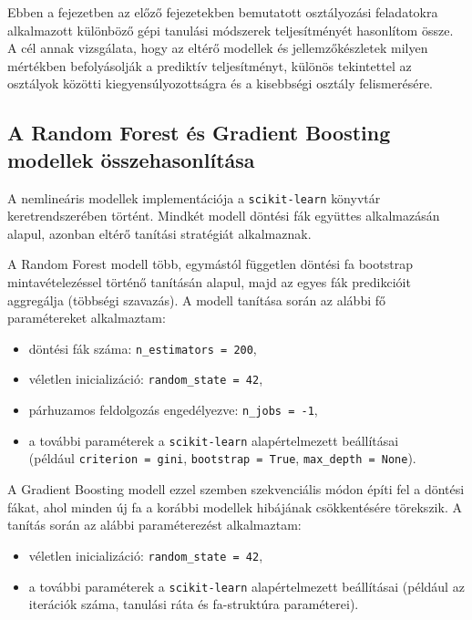 
Ebben a fejezetben az előző fejezetekben bemutatott osztályozási feladatokra
alkalmazott különböző gépi tanulási módszerek teljesítményét hasonlítom össze.
A cél annak vizsgálata, hogy az eltérő modellek és jellemzőkészletek
milyen mértékben befolyásolják a prediktív teljesítményt,
különös tekintettel az osztályok közötti kiegyensúlyozottságra
és a kisebbségi osztály felismerésére.


\subsection{A Random Forest és Gradient Boosting modellek összehasonlítása}

A nemlineáris modellek implementációja a \texttt{scikit-learn} \cite{scikit} könyvtár
keretrendszerében történt. Mindkét modell döntési fák együttes alkalmazásán
alapul, azonban eltérő tanítási stratégiát alkalmaznak.

A Random Forest modell \cite{random forest} több, egymástól független döntési fa
bootstrap mintavételezéssel történő tanításán alapul,
majd az egyes fák predikcióit aggregálja (többségi szavazás).
A modell tanítása során az alábbi fő paramétereket alkalmaztam:

\begin{itemize}
    \item döntési fák száma: \texttt{n\_estimators = 200},
    \item véletlen inicializáció: \texttt{random\_state = 42},
    \item párhuzamos feldolgozás engedélyezve: \texttt{n\_jobs = -1},
    \item a további paraméterek a \texttt{scikit-learn} alapértelmezett beállításai \\
    (például \texttt{criterion = gini}, \texttt{bootstrap = True},
    \texttt{max\_depth = None}).
\end{itemize}

A Gradient Boosting modell \cite{gradient boosting} ezzel szemben szekvenciális módon építi fel
a döntési fákat, ahol minden új fa a korábbi modellek hibájának
csökkentésére törekszik. A tanítás során az alábbi paraméterezést alkalmaztam:

\begin{itemize}
    \item véletlen inicializáció: \texttt{random\_state = 42},
    \item a további paraméterek a \texttt{scikit-learn} alapértelmezett beállításai
    (például az iterációk száma, tanulási ráta és fa-struktúra paraméterei).
\end{itemize}

